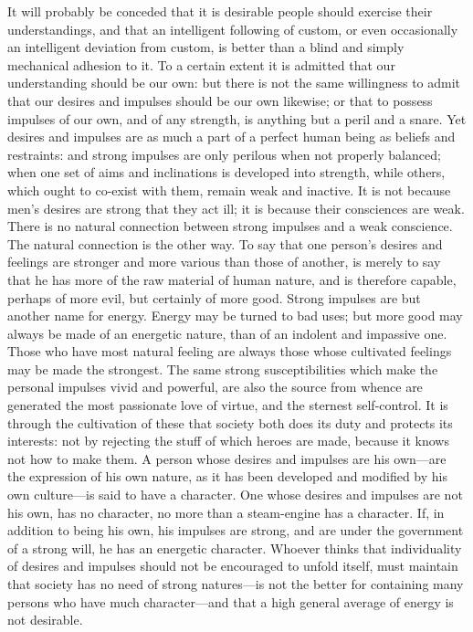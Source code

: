 \documentclass[11pt,openany]{book}
\begin{document}
It will probably be conceded that it is desirable people should exercise their understandings, and that an intelligent following of custom, or even occasionally an intelligent deviation from custom, is better than a blind and simply mechanical adhesion to it. To a certain extent it is admitted that our understanding should be our own: but there is not the same willingness to admit that our desires and impulses should be our own likewise; or that to possess impulses of our own, and of any strength, is anything but a peril and a snare. Yet desires and impulses are as much a part of a perfect human being as beliefs and restraints: and strong impulses are only perilous when not properly balanced; when one set of aims and inclinations is developed into strength, while others, which ought to co-exist with them, remain weak and inactive. It is not because men's desires are strong that they act ill; it is because their consciences are weak. There is no natural connection between strong impulses and a weak conscience. The natural connection is the other way. To say that one person's desires and feelings are stronger and more various than those of another, is merely to say that he has more of the raw material of human nature, and is therefore capable, perhaps of more evil, but certainly of more good. Strong impulses are but another name for energy. Energy may be turned to bad uses; but more good may always be made of an energetic nature, than of an indolent and impassive one. Those who have most natural feeling are always those whose cultivated feelings may be made the strongest. The same strong susceptibilities which make the personal impulses vivid and powerful, are also the source from whence are generated the most passionate love of virtue, and the sternest self-control. It is through the cultivation of these that society both does its duty and protects its interests: not by rejecting the stuff of which heroes are made, because it knows not how to make them. A person whose desires and impulses are his own---are the expression of his own nature, as it has been developed and modified by his own culture---is said to have a character. One whose desires and impulses are not his own, has no character, no more than a steam-engine has a character. If, in addition to being his own, his impulses are strong, and are under the government of a strong will, he has an energetic character. Whoever thinks that individuality of desires and impulses should not be encouraged to unfold itself, must maintain that society has no need of strong natures---is not the better for containing many persons who have much character---and that a high general average of energy is not desirable.
\end{document}
